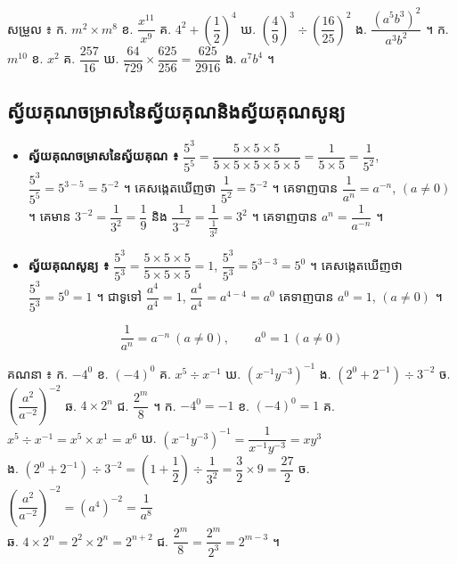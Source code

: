 \begin{pro}
សម្រួល ៖ \quad ក. $m^2\times m^8$ \quad ខ. $\dfrac{x^{11}}{x^9}$ \quad គ. $4^2 + \left(\dfrac{1}{2}\right)^4$ \quad ឃ. $\left(\dfrac{4}{9}\right)^3 \div \left(\dfrac{16}{25}\right)^2$ \quad ង. $\dfrac{(a^5b^3)^2}{a^3b^2}$ ។
\ans
ក. $m^{10}$ \quad ខ. $x^2$ \quad គ. $\dfrac{257}{16}$ \quad ឃ. $\dfrac{64}{729}\times\dfrac{625}{256} = \dfrac{625}{2916}$ \quad ង. $a^7b^4$ ។
\end{pro}

\subsection{ស្វ័យគុណចម្រាសនៃស្វ័យគុណនិងស្វ័យគុណសូន្យ}
\begin{itemize}
  \item \textbf{ស្វ័យគុណចម្រាសនៃស្វ័យគុណ ៖} $\dfrac{5^3}{5^5} = \dfrac{5\times 5\times 5}{5\times 5\times 5\times 5\times 5} = \dfrac{1}{5\times 5} = \dfrac{1}{5^2}$, $\dfrac{5^3}{5^5} = 5^{3-5} = 5^{-2}$ ។ គេសង្កេតឃើញថា $\dfrac{1}{5^2} = 5^{-2}$ ។ គេទាញបាន $\dfrac{1}{a^n} = a^{-n}$, $(a \ne 0)$ ។ គេមាន $3^{-2} = \dfrac{1}{3^2} = \dfrac{1}{9}$ និង $\dfrac{1}{3^{-2}} = \dfrac{1}{\frac{1}{3^2}} = 3^2$ ។ គេទាញបាន $a^n = \dfrac{1}{a^{-n}}$ ។
  \item \textbf{ស្វ័យគុណសូន្យ ៖} $\dfrac{5^3}{5^3} = \dfrac{5\times 5\times 5}{5\times 5\times 5} = 1$, $\dfrac{5^3}{5^3} = 5^{3-3} = 5^0$ ។ គេសង្កេតឃើញថា $\dfrac{5^3}{5^3} = 5^0 = 1$ ។ ជាទូទៅ $\dfrac{a^4}{a^4} = 1$, $\dfrac{a^4}{a^4} = a^{4-4} = a^0$ គេទាញបាន $a^0 = 1$, $(a \ne 0)$ ។
\end{itemize}
\begin{formulaBox}[ជាទូទៅ]
\[
\frac{1}{a^n} = a^{-n}\ (a \ne 0), \qquad a^0 = 1\ (a \ne 0)
\]
\end{formulaBox}

\begin{example}[លំហាត់គំរូ]
គណនា ៖ \quad ក. $-4^0$ \quad ខ. $(-4)^0$ \quad គ. $x^5 \div x^{-1}$ \quad ឃ. $(x^{-1}y^{-3})^{-1}$ \quad ង. $(2^0 + 2^{-1}) \div 3^{-2}$ \quad ច. $\left(\dfrac{a^2}{a^{-2}}\right)^{-2}$ \quad ឆ. $4\times 2^n$ \quad ជ. $\dfrac{2^m}{8}$ ។
\ans
ក. $-4^0 = -1$ \quad ខ. $(-4)^0 = 1$ \quad គ. $x^5 \div x^{-1} = x^5\times x^1 = x^6$ \quad ឃ. $(x^{-1}y^{-3})^{-1} = \dfrac{1}{x^{-1}y^{-3}} = xy^3$\\
ង. $(2^0 + 2^{-1}) \div 3^{-2} = \left(1 + \dfrac{1}{2}\right) \div \dfrac{1}{3^2} = \dfrac{3}{2}\times 9 = \dfrac{27}{2}$ \quad ច. $\left(\dfrac{a^2}{a^{-2}}\right)^{-2} = (a^4)^{-2} = \dfrac{1}{a^8}$\\
ឆ. $4\times 2^n = 2^2\times 2^n = 2^{n+2}$ \quad ជ. $\dfrac{2^m}{8} = \dfrac{2^m}{2^3} = 2^{m-3}$ ។
\end{example}

